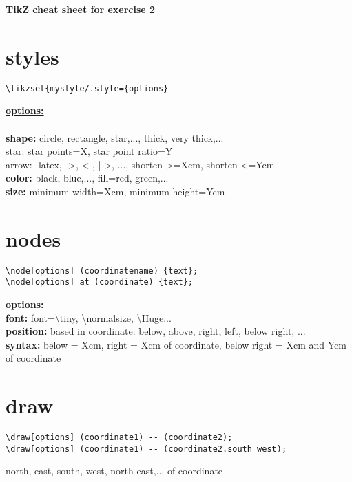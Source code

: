\documentclass[a4paper,12pt,toc=bibliography,twoside,numbers=noenddot]{scrbook}
\begin{document}
\begin{center} 
	\textbf{\Large TikZ cheat sheet for exercise 2}
\end{center}

\section*{styles}
\begin{lstlisting}
\tikzset{mystyle/.style={options}
\end{lstlisting}
\underline{\textbf{options:}}\\ \\
\textbf{shape:} circle, rectangle, star,..., thick, very thick,...\\
\phantom{x} star: star points=X, star point ratio=Y\\
\phantom{x} arrow: -latex, ->, <-, |->, ..., shorten >=Xcm, shorten <=Ycm\\
\textbf{color:} black, blue,..., fill=red, green,...\\
\textbf{size:} minimum width=Xcm, minimum height=Ycm
\vspace{1cm}

\section*{nodes}
\begin{lstlisting}
\node[options] (coordinatename) {text};
\node[options] at (coordinate) {text};
\end{lstlisting}
\underline{\textbf{options:}}\\
\textbf{font:} font={\tiny \textbackslash tiny}, {\normalsize \textbackslash normalsize}, {\Huge \textbackslash Huge}...\\
\textbf{position:} based in coordinate: below, above, right, left, below right, ...\\
\textbf{syntax:} below = Xcm, right = Xcm of coordinate, below right = Xcm and Ycm of coordinate
\vspace{1cm}

\section*{draw}
\begin{lstlisting}
\draw[options] (coordinate1) -- (coordinate2);
\draw[options] (coordinate1) -- (coordinate2.south west);
\end{lstlisting}
north, east, south, west, north east,... of coordinate
\end{document}
